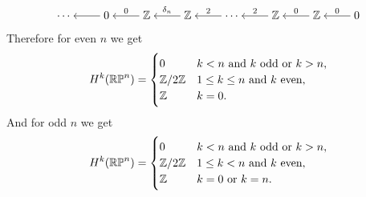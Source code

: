\documentclass[11pt,a4paper]{article}
\begin{document}
\begin{solution}
\[\begin{tikzcd}[ampersand replacement=\&,cramped]
    \cdots \& 0 \& \Z \& \Z \& \cdots \& \Z \& \Z \& 0
    \arrow[from=1-2, to=1-1]
    \arrow["0"', from=1-3, to=1-2]
    \arrow["{\delta_n}"', from=1-4, to=1-3]
    \arrow["2"', from=1-5, to=1-4]
    \arrow["2"', from=1-6, to=1-5]
    \arrow["0"', from=1-7, to=1-6]
    \arrow["0"', from=1-8, to=1-7]
  \end{tikzcd}\]
  Therefore for even $n$ we get
  \[
    H^k(\mathbb{RP}^n) =
    \begin{cases}
      0 &k < n \text{ and } k\text{ odd} \text{ or } k > n, \\
      \mathbb{Z}/2\mathbb{Z} &1 \le k \le n \text{ and } k\text{ even}, \\
      \mathbb{Z} &k = 0.
    \end{cases}
  \]
  And for odd $n$ we get
  \[
    H^k(\mathbb{RP}^n) =
    \begin{cases}
      0 &k < n \text{ and } k\text{ odd} \text{ or } k > n, \\
      \mathbb{Z}/2\mathbb{Z} &1 \le k < n \text{ and } k\text{ even}, \\
      \mathbb{Z} &k = 0 \text{ or } k = n.
    \end{cases}
  \]
\end{solution}
\end{document}
